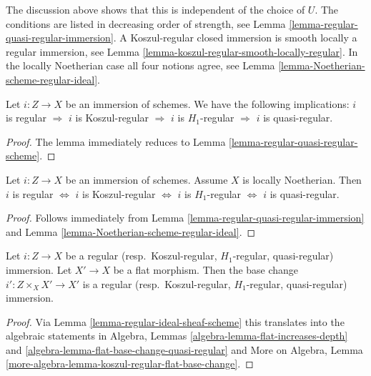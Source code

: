 \noindent
The discussion above shows that this is independent of the choice
of $U$. The conditions are listed in decreasing order of strength, see
Lemma \ref{lemma-regular-quasi-regular-immersion}.
A Koszul-regular closed immersion is smooth locally a regular immersion, see
Lemma \ref{lemma-koszul-regular-smooth-locally-regular}.
In the locally Noetherian case all four notions agree, see
Lemma \ref{lemma-Noetherian-scheme-regular-ideal}.

\begin{lemma}
\label{lemma-regular-quasi-regular-immersion}
Let $i : Z \to X$ be an immersion of schemes.
We have the following implications:
$i$ is regular $\Rightarrow$
$i$ is Koszul-regular $\Rightarrow$
$i$ is $H_1$-regular $\Rightarrow$
$i$ is quasi-regular.
\end{lemma}

\begin{proof}
The lemma immediately reduces to
Lemma \ref{lemma-regular-quasi-regular-scheme}.
\end{proof}

\begin{lemma}
\label{lemma-regular-immersion-noetherian}
Let $i : Z \to X$ be an immersion of schemes.
Assume $X$ is locally Noetherian. Then
$i$ is regular $\Leftrightarrow$
$i$ is Koszul-regular $\Leftrightarrow$
$i$ is $H_1$-regular $\Leftrightarrow$
$i$ is quasi-regular.
\end{lemma}

\begin{proof}
Follows immediately from
Lemma \ref{lemma-regular-quasi-regular-immersion}
and
Lemma \ref{lemma-Noetherian-scheme-regular-ideal}.
\end{proof}

\begin{lemma}
\label{lemma-flat-base-change-regular-immersion}
Let $i : Z \to X$ be a regular (resp.\ Koszul-regular,
$H_1$-regular, quasi-regular) immersion. Let $X' \to X$ be a flat
morphism. Then the base change $i' : Z \times_X X' \to X'$
is a regular (resp.\ Koszul-regular,
$H_1$-regular, quasi-regular) immersion.
\end{lemma}

\begin{proof}
Via
Lemma \ref{lemma-regular-ideal-sheaf-scheme}
this translates into the algebraic statements in
Algebra, Lemmas \ref{algebra-lemma-flat-increases-depth} and
\ref{algebra-lemma-flat-base-change-quasi-regular}
and
More on Algebra,
Lemma \ref{more-algebra-lemma-koszul-regular-flat-base-change}.
\end{proof}


